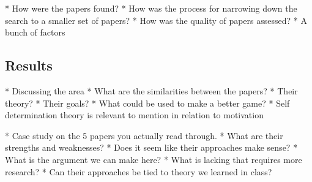     * How were the papers found? 
    * How was the process for narrowing down the search to a smaller set of papers?
    * How was the quality of papers assessed?
        * A bunch of factors
    
\subsection{Results}
    * Discussing the area
    * What are the similarities between the papers?
        * Their theory?
        * Their goals?
        * What could be used to make a better game?
    * Self determination theory is relevant to mention in relation to motivation
    
    * Case study on the 5 papers you actually read through. 
        * What are their strengths and weaknesses?
        * Does it seem like their approaches make sense?
        * What is the argument we can make here?
            * What is lacking that requires more research?
        * Can their approaches be tied to theory we learned in class?